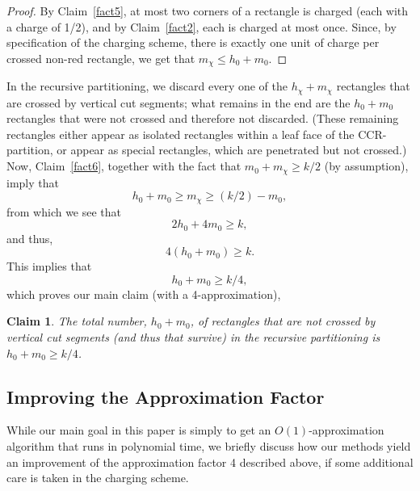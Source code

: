 \documentclass{article}
\newtheorem{claim}[theorem]{Claim}
\begin{document}
\begin{proof}
  By Claim~\ref{fact5}, at most two corners of a rectangle is charged (each with a charge of 1/2), and by Claim~\ref{fact2}, each is charged at most once.
%
Since, by specification of the charging scheme, there is exactly one unit of charge per crossed non-red rectangle, we get that $m_\chi\leq h_0+m_0$.
%
\end{proof}

In the recursive partitioning, we discard every one of the $h_\chi+m_\chi$ rectangles that are crossed by vertical cut segments;
what remains in the end are the $h_0+m_0$ rectangles that were not crossed and therefore not discarded. (These remaining rectangles either appear as isolated rectangles within a leaf face of the CCR-partition, or appear as special rectangles, which are penetrated but not crossed.)
%
%
Now, Claim~\ref{fact6}, together with the fact that $m_0+m_\chi\geq
k/2$ (by assumption), imply that
%
$$h_0+m_0 \geq m_\chi \geq (k/2) - m_0,$$
%
from which we see that
%
$$2h_0 + 4m_0 \geq k,$$
%
and thus, 
%
$$4(h_0+m_0) \geq k.$$
%
This implies that
%
$$h_0+m_0\geq k/4,$$
%
which proves our main claim (with a 4-approximation),
%
\begin{claim}\label{fact7}
  The total number, $h_0+m_0$, of rectangles that are not crossed by
  vertical cut segments (and thus that survive) in the recursive
  partitioning is $h_0+m_0 \geq k/4$.
\end{claim}


\subsection*{Improving the Approximation Factor}

While our main goal in this paper is simply to get an
$O(1)$-approximation algorithm that runs in polynomial time, we
briefly discuss how our methods yield an improvement of the
approximation factor 4 described above, if some additional care is
taken in the charging scheme.
\end{document}
